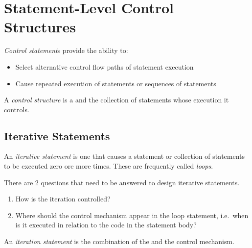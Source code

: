 \section{Statement-Level Control Structures}\label{sec:Statement_Level_Control_Structures}
\begin{definition}\label{def:Control_Statement}
  \emph{Control statement}s provide the ability to:
  \begin{itemize}[noitemsep]
  \item Select alternative control flow paths of statement execution
  \item Cause repeated execution of statements or sequences of statements
  \end{itemize}
\end{definition}

\begin{definition}\label{def:Control_Structure}
  A \emph{control structure} is a  and the collection of statements whose execution it controls.
\end{definition}

\subsection{Iterative Statements}\label{subsec:Iterative_Statements}
\begin{definition}\label{def:Iterative_Statement}
  An \emph{iterative statement} is one that causes a statement or collection of statements to be executed zero ore more times.
  These are frequently called \emph{loops}.

  There are 2 questions that need to be answered to design iterative statements.
  \begin{enumerate}[noitemsep]
  \item How is the iteration controlled?
  \item Where should the control mechanism appear in the loop statement, i.e.\ when is it executed in relation to the code in the statement body?
  \end{enumerate}

  \begin{remark}\label{rmk:Iteration_Statement}
    An \emph{iteration statement} is the combination of the  and the control mechanism.
  \end{remark}
\end{definition}

